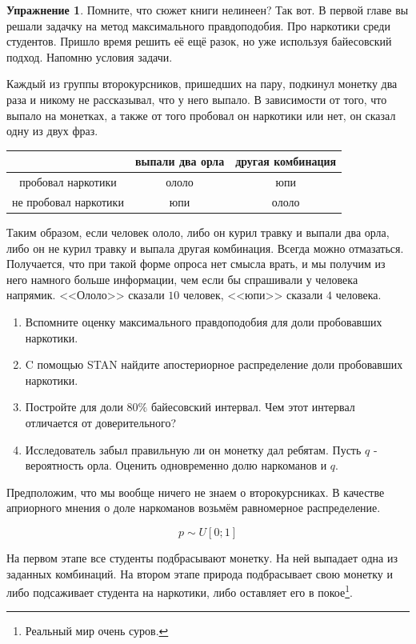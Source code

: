 \documentclass[12pt, a4paper, oneside]{extreport}
\theoremstyle{plain}              %
\theoremstyle{definition}         %
\newtheorem{problem}{\color{myblue} Упражнение}
\begin{document}
\begin{problem}
Помните, что сюжет книги нелинеен? Так вот. В первой главе вы решали задачку на метод максимального правдоподобия. Про наркотики среди студентов. Пришло время решить её ещё разок, но уже используя байесовский подход. Напомню условия задачи.  

Каждый из группы второкурсников, пришедших на пару, подкинул монетку два раза и никому не рассказывал, что у него выпало. В зависимости от того, что выпало на монетках, а также от того пробовал он наркотики или нет, он сказал одну из двух фраз.

\begin{center}
	\begin{tabular}{c|c|c}
		&  выпали два орла   & другая комбинация   \\ \hline
		пробовал наркотики      &   ололо                     &   юпи       \\ \hline
		не пробовал наркотики &	  юпи	                     &   ололо      \\
	\end{tabular}
\end{center}

Таким образом, если человек ололо, либо он курил травку и выпали два орла, либо он не курил травку и выпала другая комбинация. Всегда можно отмазаться. Получается, что при такой форме опроса нет смысла врать, и мы получим из него намного больше информации, чем если бы спрашивали у человека напрямик.  <<Ололо>> сказали $10$ человек, <<юпи>> сказали $4$ человека.

\begin{enumerate}
	\item  Вспомните оценку максимального правдоподобия для доли пробовавших наркотики. 
	\item  C помощью STAN найдите апостериорное распределение доли пробовавших наркотики. 
	\item  Постройте для доли $80\%$ байесовский интервал. Чем этот интервал отличается от доверительного? 
	\item  Исследователь забыл правильную ли он монетку дал ребятам. Пусть $q$ - вероятность орла. Оценить одновременно долю наркоманов и $q$. 
\end{enumerate}

\begin{sol} 
Предположим, что мы вообще ничего не знаем о второкурсниках. В качестве априорного мнения о доле наркоманов возьмём равномерное распределение. 

\[ p \sim U[0;1]\]

На первом этапе все студенты подбрасывают монетку. На ней выпадает одна из заданных комбинаций. На втором этапе природа подбрасывает свою монетку и либо подсаживает студента на наркотики, либо оставляет его в покое\footnote{Реальный мир очень суров.}. 

\end{sol} 	
\end{problem}
\end{document}

